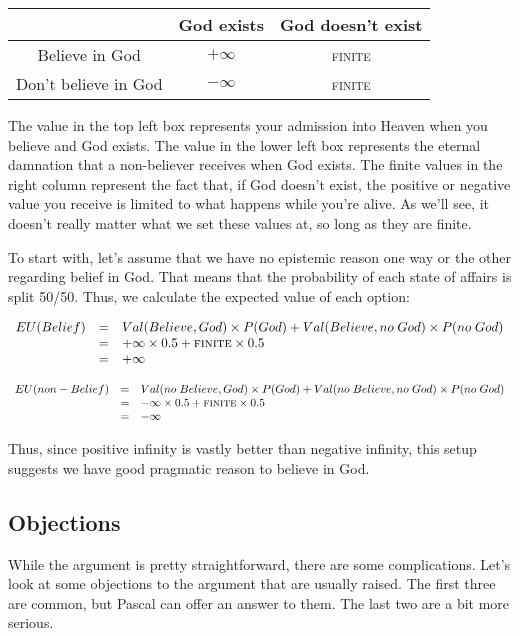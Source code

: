 \begin{center}
 \begin{tabular}{c|c|c|}
 & God exists & God doesn't exist \\ \hline
Believe in God & $+\infty$ & \textsc{finite} \\ \hline
Don't believe in God & $-\infty$ & \textsc{finite} \\ \hline
\end{tabular}
\end{center}

The value in the top left box represents your admission into Heaven when you believe and God exists.  The value in the lower left box represents the eternal damnation that a non-believer receives when God exists.  The finite values in the right column represent the fact that, if God doesn't exist, the positive or negative value you receive is limited to what happens while you're alive. As we'll see, it doesn't really matter what we set these values at, so long as they are finite.

To start with, let's assume that we have no epistemic reason one way or the other regarding belief in God.  That means that the probability of each state of affairs is split 50/50.  Thus, we calculate the expected value of each option:

\[\begin{array}{rcl}
EU(Belief) & = & Val(Believe,God)\times P(God) + Val(Believe,no \; God)\times P(no\;God) \\
 & = & +\infty\times 0.5 + \textsc{finite}\times 0.5 \\
 & = & +\infty \\   
  \end{array}\]

\[\begin{array}{rcl}
EU(non-Belief) & = & Val(no\;Believe,God)\times P(God) + Val(no\;Believe,no \; God)\times P(no\;God) \\
 & = & -\infty\times 0.5 + \textsc{finite}\times 0.5 \\
 & = & -\infty \\   
  \end{array}\]

Thus, since positive infinity is vastly better than negative infinity, this setup suggests we have good pragmatic reason to believe in God.

\subsection{Objections}
While the argument is pretty straightforward, there are some complications.  Let's look at some objections to the argument that are usually raised.  The first three are common, but Pascal can offer an answer to them.  The last two are a bit more serious.

